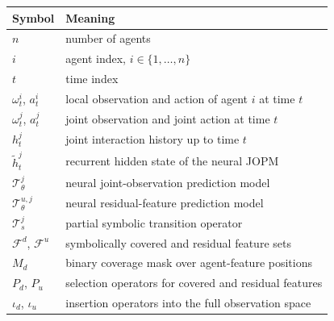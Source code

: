 \documentclass{article}
\theoremstyle{plain}
\theoremstyle{definition}
\theoremstyle{remark}
\begin{document}
\begin{table}[t]
  \centering
  \footnotesize
  \begin{tabular}{ll}
    \toprule
    \textbf{Symbol}                                             & \textbf{Meaning}                                      \\
    \midrule
    $n$                                                         & number of agents                                      \\
    $i$                                                         & agent index, $i \in \{1,\dots,n\}$                    \\
    $t$                                                         & time index                                            \\
    $\omega^i_t$, $a^i_t$                                       & local observation and action of agent $i$ at time $t$ \\
    $\omega^j_t$, $a^j_t$                                       & joint observation and joint action at time $t$        \\
    $h^j_t$                                                     & joint interaction history up to time $t$              \\
    $\tilde{h}^j_t$                                             & recurrent hidden state of the neural JOPM             \\
    $\mathcal{T}^j_\theta$                                      & neural joint-observation prediction model             \\
    $\mathcal{T}^{u,j}_\theta$                                  & neural residual-feature prediction model              \\
    $\mathcal{T}^j_s$                                           & partial symbolic transition operator                  \\
    $\mathcal{F}^d$, $\mathcal{F}^u$                            & symbolically covered and residual feature sets        \\
    $M_d$                                                       & binary coverage mask over agent-feature positions     \\
    $P_d$, $P_u$                                                & selection operators for covered and residual features \\
    $\iota_d$, $\iota_u$                                        & insertion operators into the full observation space   \\

\end{tabular}
\end{table}
\end{document}
